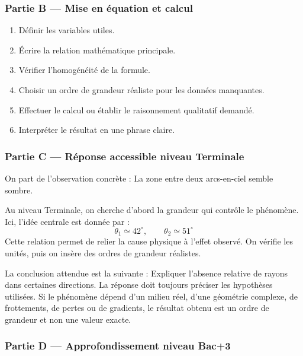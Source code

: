 \documentclass[11pt,a4paper]{article}
\begin{document}
\subsubsection*{Partie B — Mise en équation et calcul}

\begin{enumerate}
  \item Définir les variables utiles.
  \item Écrire la relation mathématique principale.
  \item Vérifier l'homogénéité de la formule.
  \item Choisir un ordre de grandeur réaliste pour les données manquantes.
  \item Effectuer le calcul ou établir le raisonnement qualitatif demandé.
  \item Interpréter le résultat en une phrase claire.
\end{enumerate}

\subsubsection*{Partie C — Réponse accessible niveau Terminale}

\begin{corrigebox}
On part de l'observation concrète : La zone entre deux arcs-en-ciel semble sombre.

Au niveau Terminale, on cherche d'abord la grandeur qui contrôle le phénomène. Ici, l'idée centrale est donnée par :
\[
\theta_1\simeq42^\circ,\qquad \theta_2\simeq51^\circ
\]
Cette relation permet de relier la cause physique à l'effet observé. On vérifie les unités, puis on insère des ordres de grandeur réalistes.

La conclusion attendue est la suivante : Expliquer l'absence relative de rayons dans certaines directions. La réponse doit toujours préciser les hypothèses utilisées. Si le phénomène dépend d'un milieu réel, d'une géométrie complexe, de frottements, de pertes ou de gradients, le résultat obtenu est un ordre de grandeur et non une valeur exacte.
\end{corrigebox}

\subsubsection*{Partie D — Approfondissement niveau Bac+3}
\end{document}
